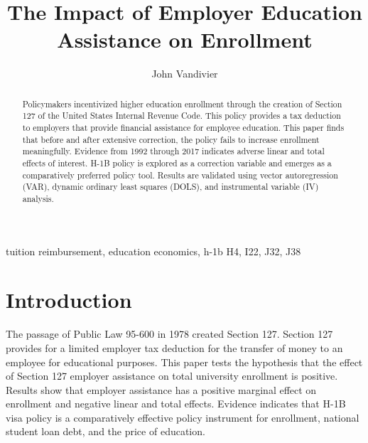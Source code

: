 \documentclass[review]{elsarticle}
\begin{document}
\begin{frontmatter}

    \title{
        The Impact of Employer Education Assistance on Enrollment
    }

    \author[mymainaddress]{John Vandivier} %
    \address[mymainaddress]{4400 University Dr, Fairfax, VA 22030}

    \begin{abstract}
        Policymakers incentivized higher education enrollment through the creation of Section 127 of the United States Internal Revenue Code.
        This policy provides a tax deduction to employers that provide financial assistance for employee education.
        This paper finds that before and after extensive correction, the policy fails to increase enrollment meaningfully.
        Evidence from 1992 through 2017 indicates adverse linear and total effects of interest.
        H-1B policy is explored as a correction variable and emerges as a comparatively preferred policy tool.
        Results are validated using vector autoregression (VAR), dynamic ordinary least squares (DOLS), and instrumental variable (IV) analysis.
    \end{abstract}

    \begin{keyword}
        tuition reimbursement, education economics, h-1b %
        \MSC[2010] H4, I22, J32, J38
    \end{keyword}
\end{frontmatter}

\pagebreak
\linenumbers

\section{Introduction}
The passage of Public Law 95-600 in 1978 created Section 127\cite{plaw95_600_1978}.
Section 127 provides for a limited employer tax deduction for the transfer of money to an employee for educational purposes.
This paper tests the hypothesis that the effect of Section 127 employer assistance on total university enrollment is positive.
Results show that employer assistance has a positive marginal effect on enrollment and negative linear and total effects.
Evidence indicates that H-1B visa policy is a comparatively effective policy instrument for enrollment,
national student loan debt, and the price of education.
\end{document}
